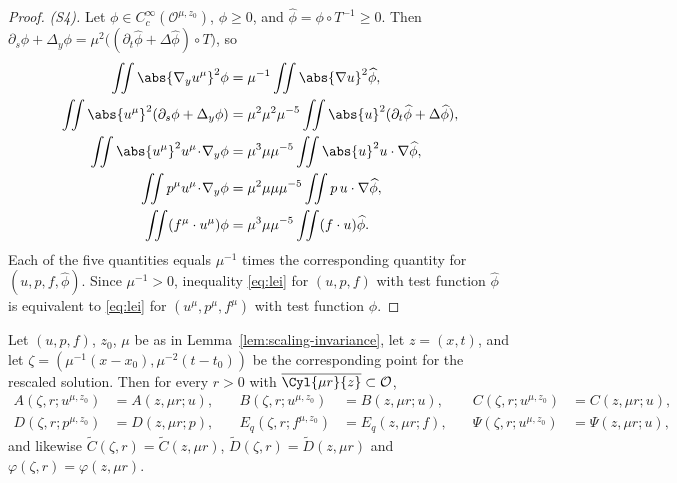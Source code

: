 \documentclass[11pt,reqno]{amsart}
\begin{document}
\begin{proof}
\emph{(S4).} Let $\phi\in C_{c}^{\infty}(\mathcal{O}^{\mu,z_{0}})$, $\phi\ge0$,
and $\widehat\phi=\phi\circ T^{-1}\ge0$. Then
$\partial_{s}\phi+\Delta_{y}\phi=\mu^{2}\bigl((\partial_{t}\widehat\phi+\Delta\widehat\phi)\circ T\bigr)$,
so
\[
\begin{aligned}
  \iint\abs{\nabla_{y}u^{\mu}}^{2}\phi
    &=\mu^{-1}\iint\abs{\nabla u}^{2}\widehat\phi,
  \\
  \iint\abs{u^{\mu}}^{2}(\partial_{s}\phi+\Delta_{y}\phi)
    &=\mu^{2}\mu^{2}\mu^{-5}\iint\abs{u}^{2}(\partial_{t}\widehat\phi+\Delta\widehat\phi),\\
  \iint\abs{u^{\mu}}^{2}u^{\mu}\!\cdot\!\nabla_{y}\phi
    &=\mu^{3}\mu\mu^{-5}\iint\abs{u}^{2}u\cdot\nabla\widehat\phi,
  \\
  \iint p^{\mu}u^{\mu}\!\cdot\!\nabla_{y}\phi
    &=\mu^{2}\mu\mu\mu^{-5}\iint p\,u\cdot\nabla\widehat\phi,\\
  \iint (f^{\mu}\cdot u^{\mu})\phi
    &=\mu^{3}\mu\mu^{-5}\iint(f\cdot u)\widehat\phi .
\end{aligned}
\]
Each of the five quantities equals $\mu^{-1}$ times the corresponding quantity
for $(u,p,f,\widehat\phi)$. Since $\mu^{-1}>0$, inequality \eqref{eq:lei} for
$(u,p,f)$ with test function $\widehat\phi$ is equivalent to \eqref{eq:lei} for
$(u^{\mu},p^{\mu},f^{\mu})$ with test function $\phi$.
\end{proof}

\begin{lemma}\label{lem:scaling-quantities}
Let $(u,p,f)$, $z_{0}$, $\mu$ be as in Lemma~\ref{lem:scaling-invariance}, let
$z=(x,t)$, and let $\zeta=(\mu^{-1}(x-x_{0}),\mu^{-2}(t-t_{0}))$ be the
corresponding point for the rescaled solution. Then for every $r>0$ with
$\overline{\Cyl{\mu r}{z}}\subset\mathcal{O}$,
\begin{equation}\label{eq:scaling-quantities}
\begin{aligned}
  A(\zeta,r;u^{\mu,z_{0}})&=A(z,\mu r;u),
  &\quad B(\zeta,r;u^{\mu,z_{0}})&=B(z,\mu r;u),
  &\quad C(\zeta,r;u^{\mu,z_{0}})&=C(z,\mu r;u),\\
  D(\zeta,r;p^{\mu,z_{0}})&=D(z,\mu r;p),
  &\quad E_{q}(\zeta,r;f^{\mu,z_{0}})&=E_{q}(z,\mu r;f),
  &\quad \Psi(\zeta,r;u^{\mu,z_{0}})&=\Psi(z,\mu r;u),
\end{aligned}
\end{equation}
and likewise $\widetilde C(\zeta,r)=\widetilde C(z,\mu r)$,
$\widetilde D(\zeta,r)=\widetilde D(z,\mu r)$ and
$\varphi(\zeta,r)=\varphi(z,\mu r)$.
\end{lemma}
\end{document}
